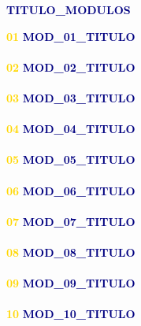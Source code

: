 \documentclass[a4paper,landscape]{article}
\begin{document}
\begin{minipage}[t]{0.345\textwidth}

{\fontsize{10}{12}\selectfont\textsf{\textcolor{gold}{}\;\textcolor{navy}{\textbf{{{TITULO_MODULOS}}}}}}

\begin{tcolorbox}[box, colback=white, colframe=bordergray, boxrule=0.4pt, top=3mm, bottom=3mm]
\fontsize{8}{10.5}\selectfont\textsf{%
\textcolor{gold}{\textbf{01}} \textcolor{navy}{\textbf{{{MOD_01_TITULO}}}}\\[-0.2mm]
{\textcolor{textsecondary}{\fontsize{6.8}{8.5}}}\\[1.5mm]
%
\textcolor{gold}{\textbf{02}} \textcolor{navy}{\textbf{{{MOD_02_TITULO}}}}\\[-0.2mm]
{\textcolor{textsecondary}{\fontsize{6.8}{8.5}}}\\[1.5mm]
%
\textcolor{gold}{\textbf{03}} \textcolor{navy}{\textbf{{{MOD_03_TITULO}}}}\\[-0.2mm]
{\textcolor{textsecondary}{\fontsize{6.8}{8.5}}}\\[1.5mm]
%
\textcolor{gold}{\textbf{04}} \textcolor{navy}{\textbf{{{MOD_04_TITULO}}}}\\[-0.2mm]
{\textcolor{textsecondary}{\fontsize{6.8}{8.5}}}\\[1.5mm]
%
\textcolor{gold}{\textbf{05}} \textcolor{navy}{\textbf{{{MOD_05_TITULO}}}}\\[-0.2mm]
{\textcolor{textsecondary}{\fontsize{6.8}{8.5}}}\\[1.5mm]
%
\textcolor{gold}{\textbf{06}} \textcolor{navy}{\textbf{{{MOD_06_TITULO}}}}\\[-0.2mm]
{\textcolor{textsecondary}{\fontsize{6.8}{8.5}}}\\[1.5mm]
%
\textcolor{gold}{\textbf{07}} \textcolor{navy}{\textbf{{{MOD_07_TITULO}}}}\\[-0.2mm]
{\textcolor{textsecondary}{\fontsize{6.8}{8.5}}}\\[1.5mm]
%
\textcolor{gold}{\textbf{08}} \textcolor{navy}{\textbf{{{MOD_08_TITULO}}}}\\[-0.2mm]
{\textcolor{textsecondary}{\fontsize{6.8}{8.5}}}\\[1.5mm]
%
\textcolor{gold}{\textbf{09}} \textcolor{navy}{\textbf{{{MOD_09_TITULO}}}}\\[-0.2mm]
{\textcolor{textsecondary}{\fontsize{6.8}{8.5}}}\\[1.5mm]
%
\textcolor{gold}{\textbf{10}} \textcolor{navy}{\textbf{{{MOD_10_TITULO}}}}\\[-0.2mm]
{\textcolor{textsecondary}{\fontsize{6.8}{8.5}}}%
}
\end{tcolorbox}

\end{minipage}%
\end{document}
